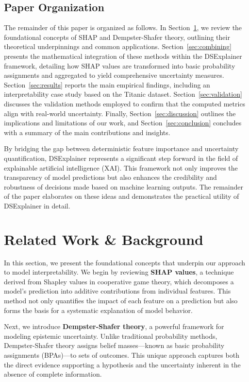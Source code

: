 \documentclass[acmlarge]{acmart}
\begin{document}
\subsection{Paper Organization}
The remainder of this paper is organized as follows. In Section~\ref{sec:background}, we review the foundational concepts of SHAP and Dempster-Shafer theory, outlining their theoretical underpinnings and common applications. Section~\ref{sec:combining} presents the mathematical integration of these methods within the DSExplainer framework, detailing how SHAP values are transformed into basic probability assignments and aggregated to yield comprehensive uncertainty measures. Section~\ref{sec:results} reports the main empirical findings, including an interpretability case study based on the Titanic dataset. Section~\ref{sec:validation} discusses the validation methods employed to confirm that the computed metrics align with real-world uncertainty. Finally, Section~\ref{sec:discussion} outlines the implications and limitations of our work, and Section~\ref{sec:conclusion} concludes with a summary of the main contributions and insights.

By bridging the gap between deterministic feature importance and uncertainty quantification, DSExplainer represents a significant step forward in the field of explainable artificial intelligence (XAI). This framework not only improves the transparency of model predictions but also enhances the credibility and robustness of decisions made based on machine learning outputs. The remainder of the paper elaborates on these ideas and demonstrates the practical utility of DSExplainer in detail.


\section{Related Work & Background}
\label{sec:background}

In this section, we present the foundational concepts that underpin our approach to model interpretability. We begin by reviewing \textbf{SHAP values}, a technique derived from Shapley values in cooperative game theory, which decomposes a model’s prediction into additive contributions from individual features. This method not only quantifies the impact of each feature on a prediction but also forms the basis for a systematic explanation of model behavior.

Next, we introduce \textbf{Dempster-Shafer theory}, a powerful framework for modeling epistemic uncertainty. Unlike traditional probability methods, Dempster-Shafer theory assigns belief masses—known as basic probability assignments (BPAs)—to sets of outcomes. This unique approach captures both the direct evidence supporting a hypothesis and the uncertainty inherent in the absence of complete information.
\end{document}

